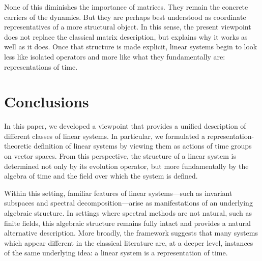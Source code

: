 \documentclass[letterpaper, 9pt, conference]{ieeeconf}
\begin{document}
None of this diminishes the importance of matrices. They remain the concrete
carriers of the dynamics. But they are perhaps best understood as coordinate
representatives of a more structural object. In this sense, the present viewpoint does not replace the classical matrix description, but explains why it works as well as it does. Once that structure is made explicit, linear systems begin to look less like isolated operators and more
like what they fundamentally are: representations of time.




\section{Conclusions}\label{sec_conclusions}

In this paper, we developed a viewpoint that provides a unified description of
different classes of linear systems. In particular, we formulated a
representation-theoretic definition of linear systems by viewing them as actions
of time groups on vector spaces. From this perspective, the structure of a
linear system is determined not only by its evolution operator, but more
fundamentally by the algebra of time and the field over which the system is
defined.

Within this setting, familiar features of linear systems—such as invariant
subspaces and spectral decomposition—arise as manifestations of an underlying
algebraic structure. In settings where spectral methods are not natural, such
as finite fields, this algebraic structure remains fully intact and provides a
natural alternative description. More broadly, the framework suggests that many
systems which appear different in the classical literature are, at a deeper
level, instances of the same underlying idea: a linear system is a
representation of time.























\end{document}
